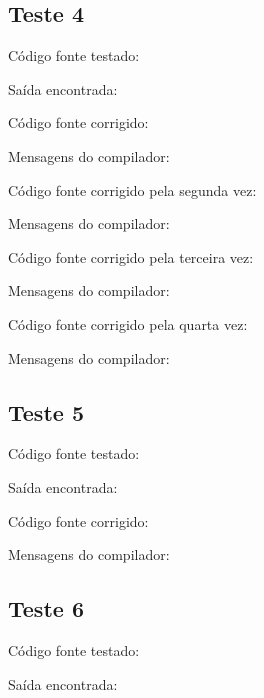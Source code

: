 \documentclass[11pt]{article}
\begin{document}
	\subsection{Teste 4}
	
		Código fonte testado:
		
			
		Saída encontrada:
		
						
		Código fonte corrigido:
		
		
		Mensagens do compilador:
		
						
		Código fonte corrigido pela segunda vez:
		
		
		Mensagens do compilador:
		
		
		Código fonte corrigido pela terceira vez:
		
		
		Mensagens do compilador:
		
				
		Código fonte corrigido pela quarta vez:
		
		
		Mensagens do compilador:
		
						
	\subsection{Teste 5}
	
		Código fonte testado:
		
			
		Saída encontrada:
		
								
		Código fonte corrigido:
		
		
		Mensagens do compilador:
		

	\newpage
	\subsection{Teste 6}
	
		Código fonte testado:
		
			
		Saída encontrada:
		
						
\end{document}
